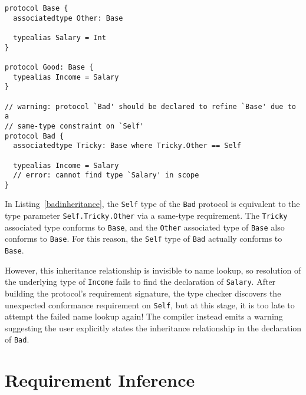 \documentclass[../generics]{subfiles}
\begin{document}
\begin{listing}\label{badinheritance}
\begin{Verbatim}
protocol Base {
  associatedtype Other: Base
  
  typealias Salary = Int
}

protocol Good: Base {
  typealias Income = Salary
}

// warning: protocol `Bad' should be declared to refine `Base' due to a
// same-type constraint on `Self'
protocol Bad {
  associatedtype Tricky: Base where Tricky.Other == Self
  
  typealias Income = Salary
  // error: cannot find type `Salary' in scope
}
\end{Verbatim}
\end{listing}
\begin{example}
In Listing~\ref{badinheritance}, the \texttt{Self} type of the \texttt{Bad} protocol is equivalent to the type parameter \texttt{Self.Tricky.Other} via a same-type requirement. The \texttt{Tricky} associated type conforms to \texttt{Base}, and the \texttt{Other} associated type of \texttt{Base} also conforms to \texttt{Base}. For this reason, the \texttt{Self} type of \texttt{Bad} actually conforms to \texttt{Base}.

However, this inheritance relationship is invisible to name lookup, so resolution of the underlying type of \texttt{Income} fails to find the declaration of \texttt{Salary}. After building the protocol's requirement signature, the type checker discovers the unexpected conformance requirement on \texttt{Self}, but at this stage, it is too late to attempt the failed name lookup again! The compiler instead emits a warning suggesting the user explicitly states the inheritance relationship in the declaration of \texttt{Bad}.
\end{example}

\section{Requirement Inference}\label{requirementinference}
\end{document}
